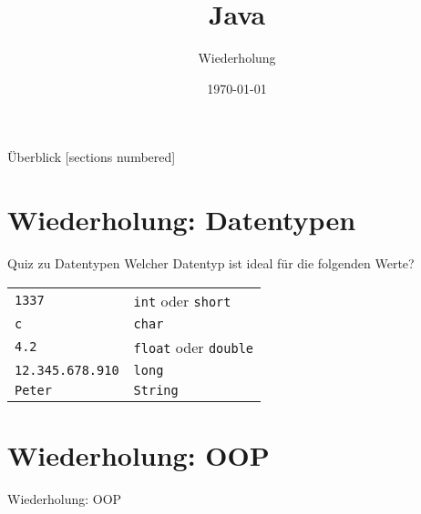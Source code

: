 

\usepackage{csquotes}
\usepackage{mathtools}

\title{Java}
\subtitle{Wiederholung}
\date{\today}



\begin{frame}
    \titlepage
\end{frame}

\begin{frame}{Überblick}
    [sections numbered]
    \tableofcontents
\end{frame}

\section{Wiederholung: Datentypen}
\begin{frame}{Quiz zu Datentypen}
    Welcher Datentyp ist ideal für die folgenden Werte? 
    \begin{center}
        \begin{tabular}{l l}
            \texttt{1337} & \pause \texttt{int} oder \texttt{short}\\
            \texttt{c} & \pause \texttt{char} \\
            \texttt{4.2} & \pause \texttt{float} oder \texttt{double} \\
            \texttt{12.345.678.910} & \pause \texttt{long} \\
            \texttt{Peter} & \pause \texttt{String}
        \end{tabular}
    \end{center}
\end{frame}

\section{Wiederholung: OOP}
\begin{frame}{Wiederholung: OOP}
\end{frame}

